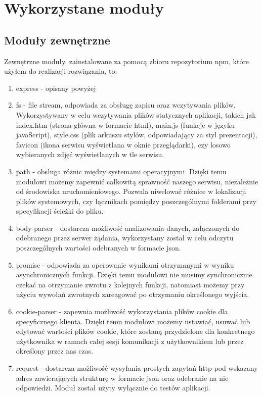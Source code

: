 \documentclass[12pt]{report}
\begin{document}
\section{Wykorzystane moduły}

\subsection{Moduły zewnętrzne}
Zewnętrzne moduły, zainstalowane za pomocą zbioru repozytorium npm, które użyłem do realizacji rozwiązania, to:
\begin{enumerate}
\item express - opisany powyżej
\item fs - file stream, odpowiada za obsługę zapisu oraz wczytywania plików. 
Wykorzystywany w celu wczytywania plików statycznych aplikacji, takich jak index.htm (strona główna w formacie html), main.js (funkcje w języku javaScript), style.css (plik arkuszu stylów, odpowiadający za styl prezentacji), favicon (ikona serwisu wyświetlana w oknie przeglądarki), czy losowo wybieranych zdjęć wyświetlanych w tle serwisu.
\item path - obsługa różnic między systemami operacyjnymi. 
Dzięki temu modułowi możemy zapewnić całkowitą sprawność naszego serwisu, niezależnie od środowiska uruchomieniowego. 
Pozwala niwelować różnice w lokalizacji plików systemowych, czy łącznikach pomiędzy poszczególnymi folderami przy specyfikacji ścieżki do pliku.
\item body-parser - dostarcza możliwość analizowania danych, załączonych do odebranego przez serwer żądania, wykorzystany został w celu odczytu poszczególnych wartości odebranych w formacie json.
\item promise - odpowiada za operowanie wynikami otrzymanymi w wyniku asynchronicznych funkcji. 
Dzięki temu modułowi nie musimy synchronicznie czekać na otrzymanie zwrotu z kolejnych funkcji, natomiast możemy przy użyciu wywołań zwrotnych zareagować po otrzymaniu określonego wyjścia.
\item cookie-parser - zapewnia możliwość wykorzystania plików cookie dla specyficznego klienta. 
Dzięki temu modułowi możemy ustawiać, usuwać lub edytować wartości plików cookie, które zostaną przydzielone dla konkretnego użytkownika w ramach całej sesji komunikacji z użytkownikiem lub przez określony przez nas czas. 
\item request - dostarcza możliwość wysyłania prostych zapytań http pod wskazany adres zawierających strukturę w formacie json oraz odebranie na nie odpowiedzi. 
Moduł został użyty wyłącznie do testów aplikacji.
\end{enumerate}
\end{document}
